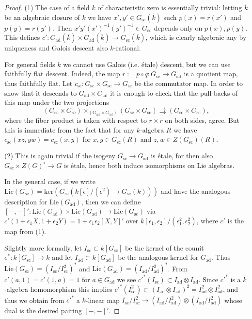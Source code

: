 \documentclass{article}
\def\tx#1{\textrm{#1}}
\theoremstyle{definition}
\numberwithin{equation}{subsection}
\renewcommand{\-}{\hyp{}}
\begin{document}
\begin{proof}
	(1) The case of a field $k$ of characteristic zero is essentially trivial: letting $\bar k$ be an algebraic closure of $k$ we have $x',y' \in G_\mathrm{sc}(\bar k)$ such $p(x)=r(x')$ and $p(y)=r(y')$. Then $x'y'(x')^{-1}(y')^{-1} \in G_\mathrm{sc}$ depends only on $p(x),p(y)$. This defines $c' : G_\tx{ad}(\bar k) \times G_\tx{ad}(\bar k) \to G_\mathrm{sc}(\bar k)$, which is clearly algebraic any by uniqueness and Galois descent also $k$-rational. 
	
	For general fields $k$ we cannot use Galois (i.e. \'etale) descent, but we can use faithfully flat descent. Indeed, the map $r:=p \circ q : G_\mathrm{sc} \to G_\tx{ad}$ is a quotient map, thus faithfully flat. Let $c_\mathrm{sc} : G_\mathrm{sc} \times G_\mathrm{sc} \to G_\mathrm{sc}$ be the commutator map. In order to show that it descends to $G_\tx{ad} \times G_\tx{ad}$ it is enough to check that the pull-backs of this map under the two projections 
	\[ (G_\mathrm{sc} \times G_\mathrm{sc}) \times_{(G_\tx{ad} \times G_\tx{ad})} (G_\mathrm{sc} \times G_\mathrm{sc}) \rightrightarrows (G_\mathrm{sc} \times G_\mathrm{sc}), \]
	where the fiber product is taken with respect to $r \times r$ on both sides, agree. But this is immediate from the fact that for any $k$-algebra $R$ we have $c_\mathrm{sc}(xz,yw)=c_\mathrm{sc}(x,y)$ for $x,y \in G_\mathrm{sc}(R)$ and $z,w \in Z(G_\mathrm{sc})(R)$. 
	
	(2) This is again trivial if the isogeny $G_\mathrm{sc} \to G_\tx{ad}$ is \'etale, for then also $G_\mathrm{sc} \times Z(G)^\circ \to G$ is \'etale, hence both induce isomorphisms on Lie algebras.
	
	In the general case, if we write $\mathrm{Lie}(G_\mathrm{sc}) = \tx{ker}(G_\mathrm{sc}(k[\epsilon]/(\epsilon^2) \to G_\mathrm{sc}(k)))$ and have the analogous description for $\mathrm{Lie}(G_\tx{ad})$, then we can define $[-,-]' : \mathrm{Lie}(G_\tx{ad}) \times \mathrm{Lie}(G_\tx{ad}) \to \mathrm{Lie}(G_\mathrm{sc})$ via $c'(1+\epsilon_1 X,1+\epsilon_2 Y)=1+\epsilon_1\epsilon_2[X,Y]'$ over $k[\epsilon_1,\epsilon_2]/(\epsilon_1^2,\epsilon_2^2)$, where $c'$ is the map from (1).
	
	Slightly more formally, let $I_\mathrm{sc} \subset k[G_\mathrm{sc}]$ be the kernel of the counit $e^* : k[G_\mathrm{sc}] \to k$ and let $I_\tx{ad} \subset k[G_\tx{ad}]$ be the analogous kernel for $G_\tx{ad}$. Thus $\mathrm{Lie}(G_\mathrm{sc})=(I_\mathrm{sc}/I_\mathrm{sc}^2)^*$ and $\mathrm{Lie}(G_\tx{ad})=(I_\tx{ad}/I_\tx{ad}^2)^*$. From $c'(a,1)=c'(1,a)=1$ for $a \in G_\tx{ad}$ we see $c'^*(I_\mathrm{sc}) \subset I_\tx{ad} \otimes I_\tx{ad}$. Since $c'^*$ is a $k$-algebra homomorphism this implies $c'^*(I_\mathrm{sc}^2) \subset (I_\tx{ad} \otimes I_\tx{ad})^2= I_\tx{ad}^2 \otimes I_\tx{ad}^2$, and thus we obtain from $c'^*$ a $k$-linear map $I_\mathrm{sc}/I_\mathrm{sc}^2 \to (I_\tx{ad}/I_\tx{ad}^2) \otimes (I_\tx{ad}/I_\tx{ad}^2)$ whose dual is the desired pairing $[-,-]'$.


\end{proof}
\end{document}
